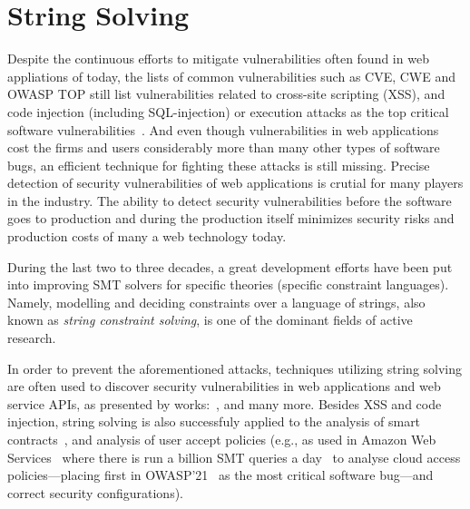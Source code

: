 \chapter{String Solving}
\label{chap:string_solving}


Despite the continuous efforts to mitigate vulnerabilities often found in web appliations of today, the lists of common vulnerabilities such as CVE, CWE and OWASP TOP still list vulnerabilities related to cross-site scripting (XSS), and code injection (including SQL-injection) or execution attacks as the top critical software vulnerabilities~\cite{OWASP13,OWASP17,OWASP21,cwe-top-25-2022, cwe-top-25-2023}.
And even though vulnerabilities in web applications cost the firms and users considerably more than many other types of software bugs, an efficient technique for fighting these attacks is still missing.
Precise detection of security vulnerabilities of web applications is crutial for many players in the industry.
The ability to detect security vulnerabilities before the software goes to production and during the production itself minimizes security risks and production costs of many a web technology today.

During the last two to three decades, a great development efforts have been put into improving SMT solvers for specific theories (specific constraint languages).
Namely, modelling and deciding constraints over a language of strings, also known as \emph{string constraint solving}, is one of the dominant fields of active research.

In order to prevent the aforementioned attacks, techniques utilizing string solving are often used to discover security vulnerabilities in web applications and web service APIs, as presented by works:~\cite{String_constraints_with_concatenation_and_transducers_solved_efficiently, Composing_Static_and_Dynamic_Analysis_to_Validate_Sanitization_in_Web_Applications, Satisfiability_Modulo_Theories_Introduction_and_Applications, Simple_linear_string_constraints,Z3-str_a_z3-based_string_solver_for_web_application_analysis,S3_A_Symbolic_String_Solver_for_Vulnerability_Detection_in_Web_Applications}, and many more.
Besides XSS and code injection, string solving is also successfuly applied to the analysis of smart contracts~\cite{AltBHS22}, and analysis of user accept policies (e.g., as used in Amazon Web Services~\cite{hadarean_mosca, stringsAWS18} where there is run a billion SMT queries a day~\cite{Rungta2022} to analyse cloud access policies---placing first in OWASP'21~\cite{OWASP21} as the most critical software bug---and correct security configurations).


